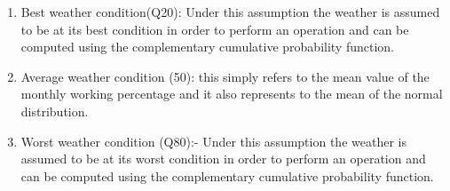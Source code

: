\begin{enumerate}[label=\roman*]
\item
Best weather condition(Q20): Under this assumption the weather is assumed to be at its best condition in order to perform an operation and can be computed using the complementary cumulative probability function. 
\item
Average weather condition (50): this simply refers to the mean value of the monthly working percentage and it also represents to the mean of the normal distribution.
\item Worst weather condition (Q80):- Under this assumption the weather is assumed to be at its worst condition in order to perform an operation and can be computed using the complementary cumulative probability function. 
\end{enumerate}

